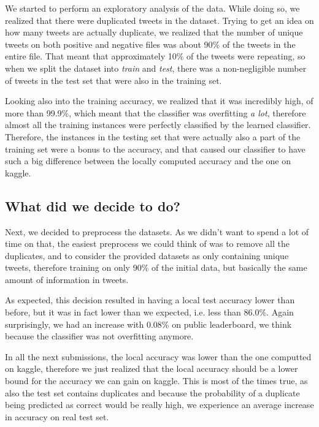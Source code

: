 \documentclass[10pt,conference,compsocconf]{IEEEtran}
\begin{document}
We started to perform an exploratory analysis of the data. While doing so, we realized that there were duplicated tweets in the dataset. Trying to get an idea on how many tweets are actually duplicate, we realized that the number of unique tweets on both positive and negative files was about 90\% of the tweets in the entire file. That meant that approximately 10\% of the tweets were repeating, so when we split the dataset into \textit{train} and \textit{test}, there was a non-negligible number of tweets in the test set that were also in the training set.

Looking also into the training accuracy, we realized that it was incredibly high, of more than 99.9\%, which meant that the classifier was overfitting \textit{a lot}, therefore almost all the training instances were perfectly classified by the learned classifier. Therefore, the instances in the testing set that were actually also a part of the training set were a bonus to the accuracy, and that caused our classifier to have such a big difference between the locally computed accuracy and the one on kaggle.

\subsection{What did we decide to do?}

Next, we decided to preprocess the datasets. As we didn't want to spend a lot of time on that, the easiest preprocess we could think of was to remove all the duplicates, and to consider the provided datasets as only containing unique tweets, therefore training on only 90\% of the initial data, but basically the same amount of information in tweets. 

As expected, this decision resulted in having a local test accuracy lower than before, but it was in fact lower than we expected, i.e. less than 86.0\%. Again surprisingly, we had an increase with 0.08\% on public leaderboard, we think because the classifier was not overfitting anymore. 

In all the next submissions, the local accuracy was lower than the one computted on kaggle, therefore we just realized that the local accuracy should be a lower bound for the accuracy we can gain on kaggle. This is most of the times true, as also the test set contains duplicates and because the probability of a duplicate being predicted as correct would be really high, we experience an average increase in accuracy on real test set.\\
\end{document}
